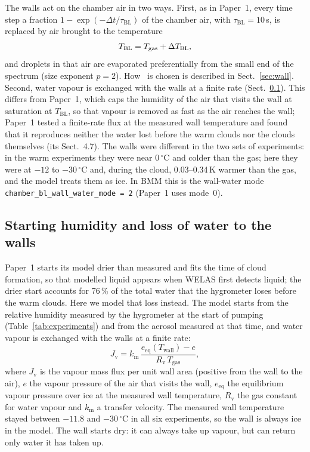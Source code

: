 The walls act on the chamber air in two ways. First, as in Paper~1, every time step a fraction $1-\exp(-\Delta t/\tau_\mathrm{BL})$ of the chamber air, with $\tau_\mathrm{BL} = 10$\,s, is replaced by air brought to the temperature
\begin{equation}
  T_\mathrm{BL} = T_\mathrm{gas} + \Delta T_\mathrm{BL} ,
  \label{eq:tbl}
\end{equation}
and droplets in that air are evaporated preferentially from the small end of the spectrum (size exponent $p = 2$). How \dTBL\ is chosen is described in Sect.~\ref{sec:wall}. Second, water vapour is exchanged with the walls at a finite rate (Sect.~\ref{sec:start}). This differs from Paper~1, which caps the humidity of the air that visits the wall at saturation at $T_\mathrm{BL}$, so that vapour is removed as fast as the air reaches the wall; Paper~1 tested a finite-rate flux at the measured wall temperature and found that it reproduces neither the water lost before the warm clouds nor the clouds themselves (its Sect.~4.7). The walls were different in the two sets of experiments: in the warm experiments they were near 0\,$^\circ$C and colder than the gas; here they were at $-12$ to $-30\,^\circ$C and, during the cloud, 0.03--0.34\,K warmer than the gas, and the model treats them as ice. In BMM this is the wall-water mode \texttt{chamber\_bl\_wall\_water\_mode = 2} (Paper~1 uses mode~0).

\subsection{Starting humidity and loss of water to the walls}\label{sec:start}

Paper~1 starts its model drier than measured and fits the time of cloud formation, so that modelled liquid appears when WELAS first detects liquid; the drier start accounts for 76\,\% of the total water that the hygrometer loses before the warm clouds. Here we model that loss instead. The model starts from the relative humidity measured by the hygrometer at the start of pumping (Table~\ref{tab:experiments}) and from the aerosol measured at that time, and water vapour is exchanged with the walls at a finite rate:
\begin{equation}
  J_\mathrm{v} = k_\mathrm{m}\,\frac{e_\mathrm{eq}(T_\mathrm{wall}) - e}{R_\mathrm{v}\,T_\mathrm{gas}},
  \label{eq:wallflux}
\end{equation}
where $J_\mathrm{v}$ is the vapour mass flux per unit wall area (positive from the wall to the air), $e$ the vapour pressure of the air that visits the wall, $e_\mathrm{eq}$ the equilibrium vapour pressure over ice at the measured wall temperature, $R_\mathrm{v}$ the gas constant for water vapour and $k_\mathrm{m}$ a transfer velocity. The measured wall temperature stayed between $-11.8$ and $-30\,^\circ$C in all six experiments, so the wall is always ice in the model. The wall starts dry: it can always take up vapour, but can return only water it has taken up.


